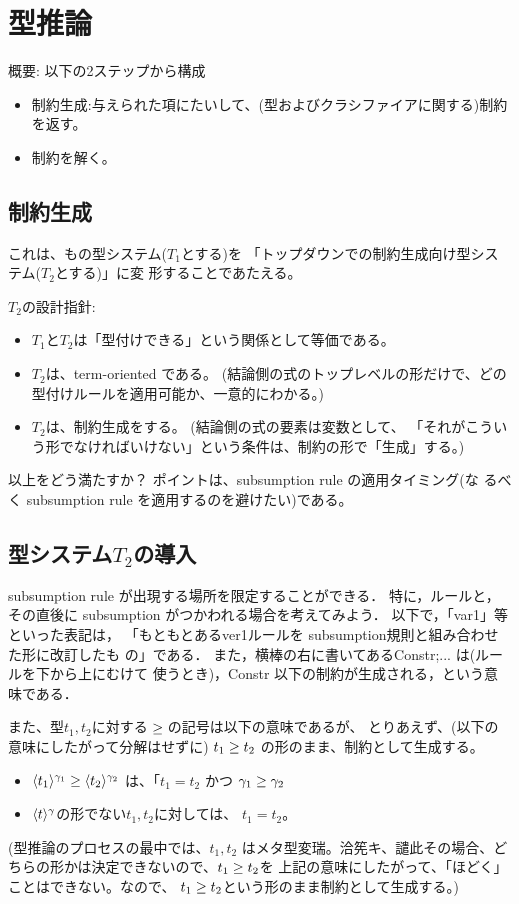\chapter{型推論}

概要: 以下の2ステップから構成
\begin{itemize}
\item 制約生成:与えられた項にたいして、(型およびクラシファイアに関する)制約を返す。
\item 制約を解く。
\end{itemize}

\section{制約生成}

これは、もの型システム($T_1$とする)を
「トップダウンでの制約生成向け型システム($T_2$とする)」に変
形することであたえる。

$T_2$の設計指針:
\begin{itemize}
\item $T_1$と$T_2$は「型付けできる」という関係として等価である。
\item $T_2$は、term-oriented である。
  (結論側の式のトップレベルの形だけで、どの型付けルールを適用可能か、一意的にわかる。)
\item $T_2$は、制約生成をする。
  (結論側の式の要素は変数として、
  「それがこういう形でなければいけない」という条件は、制約の形で「生成」する。)
\end{itemize}

以上をどう満たすか？ ポイントは、subsumption rule の適用タイミング(な
るべく subsumption rule を適用するのを避けたい)である。

\section{型システム$T_2$の導入}

subsumption rule が出現する場所を限定することができる．
特に，ルールと，その直後に subsumption がつかわれる場合を考えてみよう．
以下で，「var1」等といった表記は，
「もともとあるver1ルールを subsumption規則と組み合わせた形に改訂したも
の」である．
また，横棒の右に書いてあるConstr;... は(ルールを下から上にむけて
使うとき)，Constr 以下の制約が生成される，という意味である．

また、型$t_1, t_2$に対する${} \ge {}$の記号は以下の意味であるが、
とりあえず、(以下の意味にしたがって分解はせずに)
${t_1} \ge {t_2}$ の形のまま、制約として生成する。
\begin{itemize}
\item ${\langle{t_1}\rangle^{\gamma_1}} \ge {\langle{t_2}\rangle^{\gamma_2}}$
  は、「$t_1=t_2$ かつ ${\gamma_1} \ge {\gamma_2}$
\item $\langle{t}\rangle^{\gamma}$の形でない$t_1,t_2$に対しては、
  $t_1 = t_2$。
\end{itemize}
(型推論のプロセスの最中では、$t_1, t_2$ はメタ型変瑞。洽筅キ、譴此その場合、どちらの形かは決定できないので、${t_1} \ge {t_2}$を
上記の意味にしたがって、「ほどく」ことはできない。なので、
${t_1} \ge {t_2}$という形のまま制約として生成する。)

